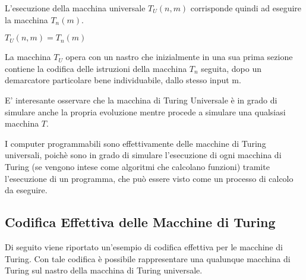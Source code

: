 L'esecuzione della macchina universale $T_U(n,m)$ corrisponde quindi
ad eseguire la macchina $T_n(m)$.

\begin{center}
$T_U(n,m) = T_n(m)$
\end{center}

\vspace{10pt}

La macchina $T_U$ opera con un nastro che inizialmente in una sua
prima sezione contiene la codifica delle istruzioni della macchina
$T_n$ seguita, dopo un demarcatore particolare bene individuabile,
dallo stesso input m.

E' interesante osservare che la macchina di Turing Universale \`e in
grado di simulare anche la propria evoluzione mentre procede a
simulare una qualsiasi macchina $T$.

I computer programmabili sono effettivamente delle macchine di Turing
universali, poich\`e sono in grado di simulare l'esecuzione di ogni
macchina di Turing (se vengono intese come algoritmi che calcolano
funzioni) tramite l'esecuzione di un programma, che pu\`o essere visto
come un processo di calcolo da eseguire.

\subsection{Codifica Effettiva delle Macchine di Turing}\label{codeffettiva}

Di seguito viene riportato un'esempio di codifica effettiva per le
macchine di Turing. Con tale codifica \`e possibile rappresentare una
qualunque macchina di Turing sul nastro della macchina di Turing
universale.\\

